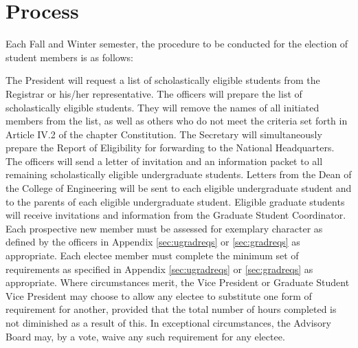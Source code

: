 \section{Process} Each Fall and Winter semester, the procedure to be conducted for the election of student members is as follows:
\begin{enumsubsection}
\itemnotoc  The President will request a list of scholastically eligible students from the Registrar  or his/her representative.
\itemnotoc The officers will prepare the list of scholastically eligible students. They will remove the names of all initiated members from the list, as well as others who do not meet the criteria set forth in Article IV.2 of the chapter Constitution. The Secretary will simultaneously prepare the Report of Eligibility for forwarding to the National Headquarters.
\itemnotoc The officers will send a letter of invitation and an information packet to all remaining scholastically eligible undergraduate students.
\itemnotoc Letters from the Dean of the College of Engineering will be sent to each eligible undergraduate student and to the parents of each eligible undergraduate student.  Eligible graduate students will receive invitations and information from the Graduate Student Coordinator.
\itemnotoc Each prospective new member must be assessed for exemplary character as defined by the officers in Appendix \ref{sec:ugradreqs} or \ref{sec:gradreqs} as appropriate. %
\itemnotoc  Each electee member must complete the minimum set of requirements as specified in Appendix \ref{sec:ugradreqs} or \ref{sec:gradreqs} as appropriate. Where circumstances merit, the Vice President or Graduate Student Vice President may choose to allow any electee to substitute one form of requirement for another, provided that the total number of hours completed is not diminished as a result of this. In exceptional circumstances, the Advisory Board may, by a  vote, waive any such requirement for any electee.


\end{enumsubsection}
